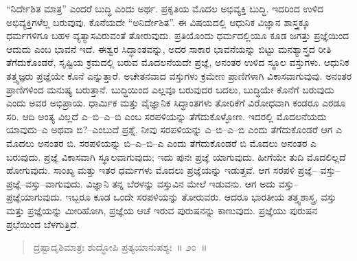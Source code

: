 “ನಿರ್ದೇಶಿತ ಮಾತ್ರ” ಎಂದರೆ ಬುದ್ಧಿ ಎಂದು ಅರ್ಥ. ಪ್ರಕೃತಿಯ ಮೊದಲ ಅಭಿವ್ಯಕ್ತಿ ಬುದ್ಧಿ. ಇದರಿಂದ ಉಳಿದ ಅಭಿವ್ಯಕ್ತಿಗಳೆಲ್ಲ ಬರುವುವು. ಕೊನೆಯದೇ “ಅನಿರ್ದೇಶಿತ”. ಈ ವಿಷಯದಲ್ಲಿ ಆಧುನಿಕ ವಿಜ್ಞಾನ ಶಾಸ್ತ್ರಕ್ಕೂ ಧರ್ಮಗಳಿಗೂ ಬಹಳ ವ್ಯತ್ಯಾಸವಿರುವಂತೆ ತೋರುವುದು. ಪ್ರತಿಯೊಂದು ಧರ್ಮದಲ್ಲಿಯೂ ಕೂಡ ಜಗತ್ತು ಪ್ರಜ್ಞೆಯಿಂದ ಆದುದು ಎಂಬ ಭಾವನೆ ಇದೆ. ಈಶ್ವರ ಸಿದ್ಧಾಂತವನ್ನು, ಅದರ ಸಾಕಾರ ಭಾವನೆಯನ್ನು ಬಿಟ್ಟು ಮನಶ್ಯಾಸ್ತ್ರದ ರೀತಿ ತೆಗೆದುಕೊಂಡರೆ, ಸೃಷ್ಟಿಯ ಕ್ರಮದಲ್ಲಿ ಬರುವ ಮೊದಲನೆಯದೇ ಪ್ರಜ್ಞೆ, ಅನಂತರ ಉಳಿದ ಸ್ಥೂಲ ವಸ್ತುಗಳು. ಆಧುನಿಕ ತತ್ತ್ವಜ್ಞರು ಪ್ರಜ್ಞೆಯೇ ಕೊನೆ ಎನ್ನುತ್ತಾರೆ. ಅಚೇತನವಾದ ವಸ್ತುಗಳು ಕ್ರಮೇಣ ಪ್ರಾಣಿಗಳಾಗಿ ವಿಕಾಸವಾಗುವುವು. ಅನಂತರ ಪ್ರಾಣಿಗಳಿಂದ ಮನುಷ್ಯ ಬರುತ್ತಾನೆ. ಬುದ್ಧಿಯಿಂದ ಎಲ್ಲವೂ ಬರುವುದರ ಬದಲು, ಬುದ್ಧಿಯೇ ಕೊನೆಗೆ ಬರುವುದು ಎಂದು ಅವರ ಅಭಿಪ್ರಾಯ. ಧಾರ್ಮಿಕ ಮತ್ತು ವೈಜ್ಞಾನಿಕ ಸಿದ್ಧಾಂತಗಳು ತೋರಿಕೆಗೆ ವಿರೋಧವಾಗಿ ಕಂಡರೂ ಎರಡೂ ಸರಿ. ಆದಿ ಅಂತ್ಯ ವಿಲ್ಲದೆ ಎ–ಬಿ–ಎ–ಬಿ ಎಂಬ ಸರಪಳಿಯನ್ನು ತೆಗೆದುಕೊಳ್ಳೋಣ. ಇದರಲ್ಲಿ ಮೊದಲನೆಯದು ಯಾವುದು–ಎ ಅಥವಾ ಬಿ?–ಎಂಬುದೆ ಪ್ರಶ್ನೆ. ನೀವು ಸರಪಳಿಯನ್ನು ಎ–ಬಿ–ಎ–ಬಿ ಎಂದು ತೆಗೆದುಕೊಂಡರೆ ಆಗ ಎ ಮೊದಲು ಅನಂತರ ಬಿ. ಸರಪಳಿಯನ್ನು ಬಿ–ಎ–ಬಿ–ಎ ಎಂದು ತೆಗೆದುಕೊಂಡರೆ ಬಿ ಮೊದಲು ಅನಂತರ ಎ ಬರುವುದು. ಪ್ರಜ್ಞೆ ವಿಕಾಸವಾಗಿ ಸ್ಥೂಲವಾಗುವುದು; ಇದು ಪುನಃ ಪ್ರಜ್ಞೆ ಯಾಗುವುದು. ಹೀಗೆಯೇ ತುದಿ ಮೊದಲಿಲ್ಲದೆ ಹೋಗುವುದು. ಸಾಂಖ್ಯ ಮತ್ತು ಇತರ ಧರ್ಮಗಳು ಮೊದಲು ಪ್ರಜ್ಞೆಯನ್ನು ಇಡುತ್ತವೆ. ಆಗ ಸರಪಳಿ ಪ್ರಜ್ಞೆ– ವಸ್ತು–ಪ್ರಜ್ಞೆ–ವಸ್ತು–ವಾಗುವುದು. ವಿಜ್ಞಾನಿ ತನ್ನ ಬೆರಳನ್ನು ವಸ್ತುವಿನ ಮೇಲೆ ಇಡುವನು. ಆಗ ಅದು ವಸ್ತು–ಪ್ರಜ್ಞೆಯಾಗುವುದು. ಇಬ್ಬರೂ ಕೂಡ ಒಂದೇ ಸರಪಳಿಯನ್ನು ತೋರುವರು. ಆದರೂ ಭಾರತೀಯ ತತ್ತ್ವಶಾಸ್ತ್ರ, ವಸ್ತು ಮತ್ತು ಪ್ರಜ್ಞೆಯನ್ನು ಮೀರಿಹೋಗಿ, ಪ್ರಜ್ಞೆಯ ಆಚೆ ಇರುವ ಪುರುಷನನ್ನು ಕಾಣುವುದು. ಪ್ರಜ್ಞೆಯು ಪುರುಷನ ಪ್ರಭೆಯಿಂದ ಬೆಳಗುತ್ತಿದೆ. 

\vspace{-0.2cm}

\begin{verse}
ದ್ರಷ್ಟಾದೃಶಿಮಾತ್ರಃ ಶುದ್ಧೋಪಿ ಪ್ರತ್ಯಯಾನುಪಶ್ಯಃ~॥ ೨೦~॥
\end{verse}

\vspace{-0.5cm}


\vskip 0.2cm

